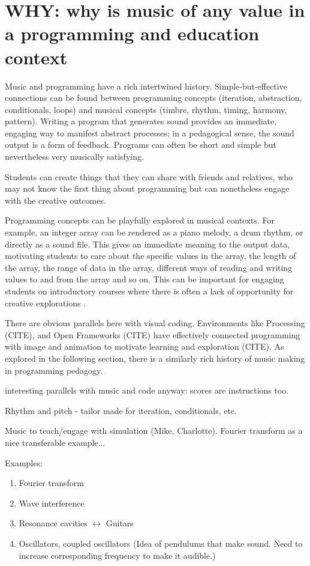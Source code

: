\section{WHY: why is music of any value in a programming and education context} \label{sec:why}

Music and programming have a rich intertwined history. Simple-but-effective connections can be found between programming concepts (iteration, abstraction, conditionals, loops) and musical concepts (timbre, rhythm, timing, harmony, pattern). Writing a program that generates sound provides an immediate, engaging way to manifest abstract processes; in a pedagogical sense, the sound output is a form of feedback. Programs can often be short and simple but nevertheless very musically satisfying. 

Students can create things that they can share with friends and relatives, who may not know the first thing about programming but can nonetheless engage with the creative outcomes. 

Programming concepts can be playfully explored in musical contexts. For example, an integer array can be rendered as a piano melody, a drum rhythm, or directly as a sound file. This gives an immediate meaning to the output data, motivating students to care about the specific values in the array, the length of the array, the range of data in the array, different ways of reading and writing values to and from the array and so on. This can be important for engaging students on introductory courses where there is often a lack of opportunity for creative explorations \cite{sharmin_creativity_2021}.

There are obvious parallels here with visual coding. Environments like Processing (CITE), and Open Frameworks (CITE) have effectively connected programming with image and animation to motivate learning and exploration (CITE). As explored in the following section, there is a similarly rich history of music making in programming pedagogy.



interesting parallels with music and code anyway: scores are instructions too.

Rhythm and pitch - tailor made for iteration, conditionals, etc.

Music to teach/engage with simulation (Mike, Charlotte). Fourier transform as a nice transferable example...

Examples:
\begin{enumerate}
    \item Fourier transform
    \item Wave interference
    \item Resonance cavities $\leftrightarrow{}$ Guitars
    \item Oscillators, coupled oscillators (Idea of pendulums that make sound. Need to increase corresponding frequency to make it audible.)
\end{enumerate}


